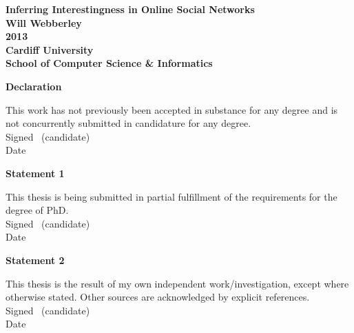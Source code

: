 




\frontmatter

\begin{titlepage}

\begin{center}
\vspace*{3ex}
\textbf{\Huge Inferring Interestingness in Online Social Networks}\\[2ex]

\textbf{\LARGE Will Webberley}\\
\vfill
\textbf{\LARGE 2013}\\
\vfill
\textbf{\LARGE Cardiff University}\\[1ex]
\textbf{\LARGE School of Computer Science \& Informatics}\\[4ex]
\end{center}

\end{titlepage}

\newpage\thispagestyle{empty}\cleardoublepage


\thispagestyle{plain}

\vspace*{6ex}

\textbf{\large Declaration}

This work has not previously been accepted in substance for any degree and is not concurrently submitted in candidature for any degree.\\[2ex]
Signed \dotfill \ (candidate) \hspace*{10em}\\[1ex]
Date\ \ \ \ \ \dotfill \hspace*{18em}

\vfill

\textbf{\large Statement 1}

This thesis is being submitted in partial fulfillment of the requirements for the degree of PhD.\\[2ex]
Signed \dotfill \ (candidate) \hspace*{10em}\\[1ex]
Date\ \ \ \ \ \dotfill \hspace*{18em}

\textbf{\large Statement 2}

This thesis is the result of my own independent work/investigation,
except where otherwise stated. Other sources are acknowledged by
explicit references.\\[2ex]
Signed \dotfill \ (candidate) \hspace*{10em}\\[1ex]
Date\ \ \ \ \ \dotfill \hspace*{18em}

